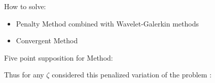 How to solve: %

\begin{itemize}
\item Penalty Method combined with Wavelet-Galerkin methods
\item Convergent Method
\end{itemize}

Five point supposition for Method:

Thus for any $\zeta$ considered this penalized variation of the problem :  

